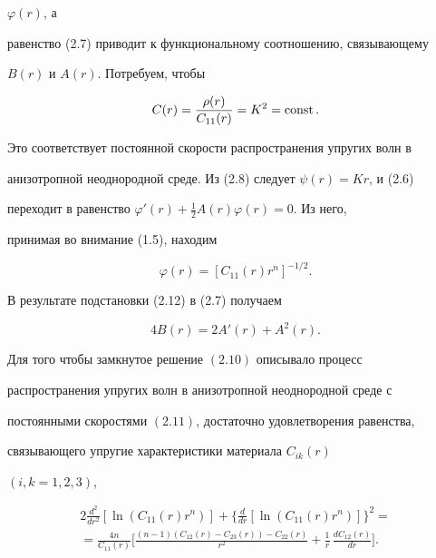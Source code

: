 \begin{case}
$\varphi(r)$, а 


равенство (2.7) приводит к функциональному соотношению, связывающему 


$B(r)$ и $A(r)$. Потребуем, чтобы 


\begin{equation} 


C(r)=\frac{\rho(r)}{C_{11}(r)}=K^2=\const. 


\end{equation} 


Это соответствует постоянной скорости распространения упругих волн в 


анизотропной неоднородной среде. Из (2.8) следует $\psi(r)=Kr$, и (2.6) 


переходит в равенство $\varphi'(r)+\frac{1}{2}A(r)\varphi(r)=0$. Из него, 


принимая во внимание (1.5), находим 


\begin{equation} 


\varphi(r)=[C_{11}(r)r^n]^{-1/2}. 


\end{equation} 


В результате подстановки (2.12) в (2.7) получаем 


\begin{equation} 


4B(r)=2A'(r)+A^2(r). 


\end{equation} 


\end{case} 


 


\begin{thm} 


Для того чтобы замкнутое решение $(2.10)$ описывало процесс 


распространения упругих волн в анизотропной неоднородной среде с 


постоянными скоростями $(2.11)$, достаточно удовлетворения равенства, 


связывающего упругие характеристики материала $C_{ik}(r)$ 


$(i,k=1,2,3)$, 


\begin{multline} 


2\frac{d^2}{dr^2}[\ln(C_{11}(r)r^n)]+\biggl\{ 


\frac{d}{dr}[\ln(C_{11}(r)r^n)]\biggr\}^2= \\


=\frac{4n}{C_{11}(r)}\biggl[ 


\frac{(n-1)(C_{12}(r)-C_{23}(r))-C_{22}(r)}{r^2}+ 


\frac{1}{r}\,\frac{d C_{12}(r)}{dr}\biggr]. 


\end{multline} 


\end{thm} 


